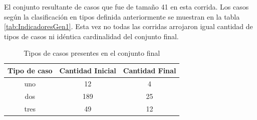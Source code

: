 \documentclass[a4paper,12pt]{book}
\begin{document}
	El conjunto resultante de casos que fue de tamaño 41 en esta corrida. Los casos según la clasificación en tipos definida anteriormente se muestran en la tabla \ref{tab:IndicadoresGen1}. Esta vez no todas las corridas arrojaron igual cantidad de tipos de casos ni idéntica cardinalidad del conjunto final.

	\begin{table}[h]
		\begin{center}
			\begin{tabular}{| c | c | c |} \hline
				Tipo de caso & Cantidad Inicial & Cantidad Final \\ \hline
				uno & 12 & 4 \\
				dos & 189 & 25 \\
				tres & 49 & 12 \\ \hline
			\end{tabular}
			\caption{Tipos de casos presentes en el conjunto final}
			\label{tab:TiposdecasosGen1}
		\end{center}
	\end{table}
	



\end{document}
